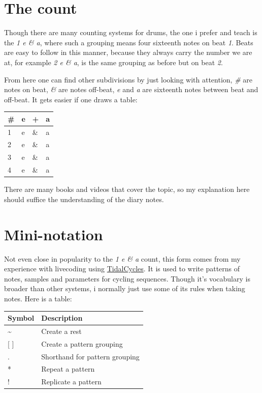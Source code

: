 \documentclass[
]{book}
\begin{document}
\hypertarget{the-count}{%
\section*{The count}\label{the-count}}

Though there are many counting systems for drums, the one i prefer and teach is the \emph{1 e \& a}, where such a grouping means four sixteenth notes on beat \emph{1}. Beats are easy to follow in this manner, because they always carry the number we are at, for example \emph{2 e \& a}, is the same grouping as before but on beat \emph{2}.

From here one can find other subdivisions by just looking with attention, \emph{\#} are notes on beat, \emph{\&} are notes off-beat, \emph{e} and \emph{a} are sixteenth notes between beat and off-beat. It gets easier if one draws a table:

\begin{longtable}[]{@{}llll@{}}
\toprule
\# & e & + & a \\
\midrule
\endhead
1 & e & \& & a \\
2 & e & \& & a \\
3 & e & \& & a \\
4 & e & \& & a \\
\bottomrule
\end{longtable}

There are many books and videos that cover the topic, so my explanation here should suffice the understanding of the diary notes.

\hypertarget{mini-notation}{%
\section*{Mini-notation}\label{mini-notation}}

Not even close in popularity to the \emph{1 e \& a} count, this form comes from my experience with livecoding using \href{https://tidalcycles.org/}{TidalCycles}. It is used to write patterns of notes, samples and parameters for cycling sequences. Though it's vocabulary is broader than other systems, i normally just use some of its rules when taking notes. Here is a table:

\begin{longtable}[]{@{}ll@{}}
\toprule
Symbol & Description \\
\midrule
\endhead
\textasciitilde{} & Create a rest \\
{[} {]} & Create a pattern grouping \\
. & Shorthand for pattern grouping \\
* & Repeat a pattern \\
! & Replicate a pattern \\
\bottomrule
\end{longtable}
\end{document}
